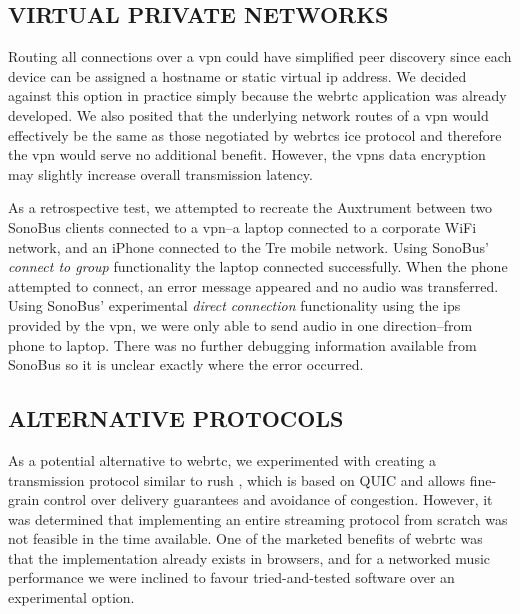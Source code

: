 \documentclass[fleqn]{jaes}
\begin{document}
\subsection{VIRTUAL PRIVATE NETWORKS}
Routing all connections over a \gls{vpn} could have simplified peer discovery since each device can be assigned a hostname or static virtual \gls{ip} address. We decided against this option in practice simply because the \gls{webrtc} application was already developed. We also posited that the underlying network routes of a \gls{vpn} would effectively be the same as those negotiated by \Glspl{webrtc} \gls{ice} protocol and therefore the \gls{vpn} would serve no additional benefit. However, the \Glspl{vpn} data encryption may slightly increase overall transmission latency.

As a retrospective test, we attempted to recreate the Auxtrument between two SonoBus clients connected to a \gls{vpn}--a laptop connected to a corporate WiFi network, and an iPhone connected to the Tre mobile network. Using SonoBus' \textit{connect to group} functionality the laptop connected successfully. When the phone attempted to connect, an error message appeared and no audio was transferred. Using SonoBus' experimental \textit{direct connection} functionality using the \glspl{ip} provided by the \gls{vpn}, we were only able to send audio in one direction--from phone to laptop. There was no further debugging information available from SonoBus so it is unclear exactly where the error occurred.

\subsection{ALTERNATIVE PROTOCOLS}
As a potential alternative to \gls{webrtc}, we experimented with creating a transmission protocol similar to \gls{rush} \cite{pugin_rush_2021}, which is based on QUIC \cite{iyengar_quic_2021} and allows fine-grain control over delivery guarantees and avoidance of congestion. However, it was determined that implementing an entire streaming protocol from scratch was not feasible in the time available. One of the marketed benefits of \gls{webrtc} was that the implementation already exists in browsers, and for a networked music performance we were inclined to favour tried-and-tested software over an experimental option.

\end{document}
